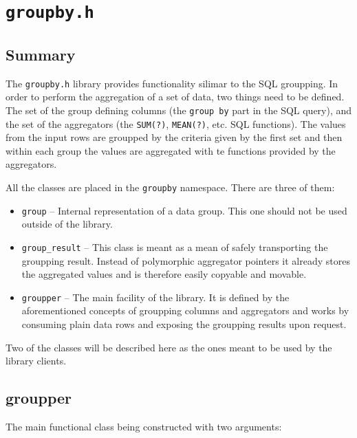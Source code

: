 
\section{\texttt{groupby.h}}

	\subsection{Summary}
	The \texttt{groupby.h} library provides functionality silimar to the SQL
	groupping. In order to perform the aggregation of a set of data, two
	things need to be defined. The set of the group defining columns
	(the \texttt{group by} part in the SQL query), and the set of the aggregators
	(the \texttt{SUM(?)}, \texttt{MEAN(?)}, etc. SQL functions). The values from
	the input rows are groupped by the criteria given by the first set and then
	within each group the values are aggregated with te functions provided by
	the aggregators.

	All the classes are placed in the \texttt{groupby} namespace. There are three
	of them:

	\begin{itemize}
		\item \texttt{group} -- Internal representation of a data group.
			This one should not be used outside of the library.
		\item \texttt{group\_result} -- This class is meant as a mean of
			safely transporting the groupping result. Instead of
			polymorphic aggregator pointers it already stores the
			aggregated values and is therefore easily copyable and
			movable.
		\item \texttt{groupper} -- The main facility of the library. It
			is defined by the aforementioned concepts of groupping
			columns and aggregators and works by consuming plain data
			rows and exposing the groupping results upon request.
	\end{itemize}

	Two of the classes will be described here as the ones meant to be used by
	the library clients.

	\subsection{groupper}
	The main functional class being constructed with two arguments:

